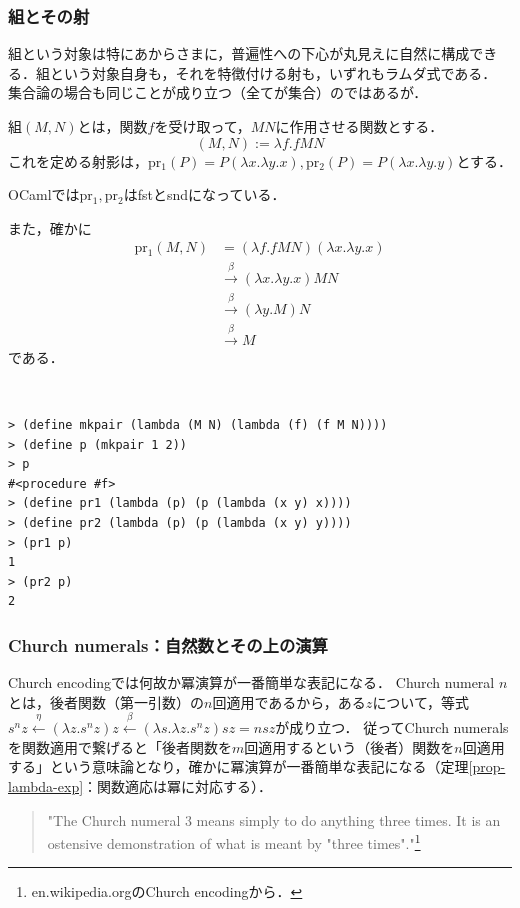 \documentclass[uplatex, dvipdfmx]{jsreport}
\begin{document}
\subsubsection{組とその射}
組という対象は特にあからさまに，普遍性への下心が丸見えに自然に構成できる．組という対象自身も，それを特徴付ける射も，いずれもラムダ式である．
集合論の場合も同じことが成り立つ（全てが集合）のではあるが．

\begin{shadebox}\begin{definition}[tuple]
    組$(M,N)$とは，関数$f$を受け取って，$MN$に作用させる関数とする．
    \[ (M,N):=\lambda f.fMN \]
    これを定める射影は，$\mathrm{pr_1}(P)=P(\lambda x.\lambda y.x), \mathrm{pr_2}(P)=P(\lambda x.\lambda y.y)$とする．
\end{definition}\end{shadebox}
\begin{remark}
    OCamlでは$\mathrm{pr_1,pr_2}$はfstとsndになっている．

    また，確かに
    \begin{align*}
        \mathrm{pr_1}(M,N) &= (\lambda f.fMN)(\lambda x.\lambda y.x) \\
        &\xrightarrow{\beta} (\lambda x.\lambda y.x) MN \\
        &\xrightarrow{\beta} (\lambda y.M)N \\
        &\xrightarrow{\beta} M
    \end{align*}
    である．
\end{remark}

\begin{example}[Scheme]　
    
\begin{lstlisting}
> (define mkpair (lambda (M N) (lambda (f) (f M N))))
> (define p (mkpair 1 2))
> p
#<procedure #f>
> (define pr1 (lambda (p) (p (lambda (x y) x))))
> (define pr2 (lambda (p) (p (lambda (x y) y))))
> (pr1 p)
1
> (pr2 p)
2
\end{lstlisting}
\end{example}

\subsubsection{Church numerals：自然数とその上の演算}
Church encodingでは何故か冪演算が一番簡単な表記になる．
Church numeral $n$とは，後者関数（第一引数）の$n$回適用であるから，ある$z$について，等式$s^nz\xleftarrow{\eta}(\lambda z.s^nz)z\xleftarrow{\beta}(\lambda s.\lambda z.s^nz)sz=nsz$が成り立つ．
従ってChurch numeralsを関数適用で繋げると「後者関数を$m$回適用するという（後者）関数を$n$回適用する」という意味論となり，確かに冪演算が一番簡単な表記になる（定理\ref{prop-lambda-exp}：関数適応は冪に対応する）．
\begin{quote}
    "The Church numeral 3 means simply to do anything three times. It is an ostensive demonstration of what is meant by "three times"."\footnote{en.wikipedia.orgのChurch encodingから．}
\end{quote}
\end{document}
